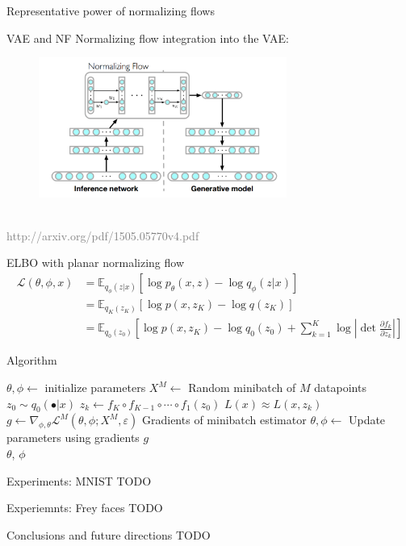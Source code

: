 \documentclass[unicode,11pt]{beamer}
\begin{document}
\begin{frame}[fragile]{Representative power of normalizing flows}
\end{frame}



\begin{frame}[fragile]{VAE and NF}
  Normalizing flow integration into the VAE:\\
  \begin{figure}[htbp]
    \includegraphics[height=130pt, keepaspectratio = true]{images/norFlow}
  \end{figure}
  ~\\
  \tiny \textcolor{gray}{http://arxiv.org/pdf/1505.05770v4.pdf}
\end{frame}


\begin{frame}[fragile]{ELBO with planar normalizing flow}
  \begin{align*}
  \mathcal{L}(\theta, \phi, x) &= \mathbb{E}_{q_\phi(z|x)} \left[ \log p_\theta(x, z) - \log q_\phi(z | x) \right] \\
  &= \mathbb{E}_{q_K(z_K)} \left[ \log p(x, z_K) - \log q(z_K) \right] \\
  &= \mathbb{E}_{q_0(z_0)} \left[ \log p(x, z_K) - \log q_0(z_0) + \sum_{k=1}^K \log \left\vert \det
  \frac{\partial f_k}  {\partial z_k} \right\vert \right]
  \end{align*}
\end{frame}


\begin{frame}[fragile]{Algorithm}
  \begin{algorithmic}
    \State $\theta, \phi \gets$ initialize parameters
    \Repeat
       \State $X^M \gets$ Random minibatch of $M$ datapoints
       \State $z_0 \sim q_0(\bullet|x)$
       \State $z_k \gets f_K \circ f_{K-1} \circ \cdots \circ f_1(z_0)$
       \State $L(x) \approx L(x, z_k)$
       \State $g \gets \nabla_{\phi, \theta} \mathcal{L}^M(\theta, \phi; X^M, \varepsilon) $ Gradients of minibatch estimator
       \State $\theta, \phi \gets$ Update parameters using gradients $g$
    \\
    \Return $\theta$, $\phi$
  \end{algorithmic}

\end{frame}


\begin{frame}[fragile]{Experiments: MNIST}
  TODO
\end{frame}


\begin{frame}[fragile]{Experiemnts: Frey faces}
  TODO
\end{frame}


\begin{frame}[fragile]{Conclusions and future directions}
  TODO
\end{frame}
\end{document}
